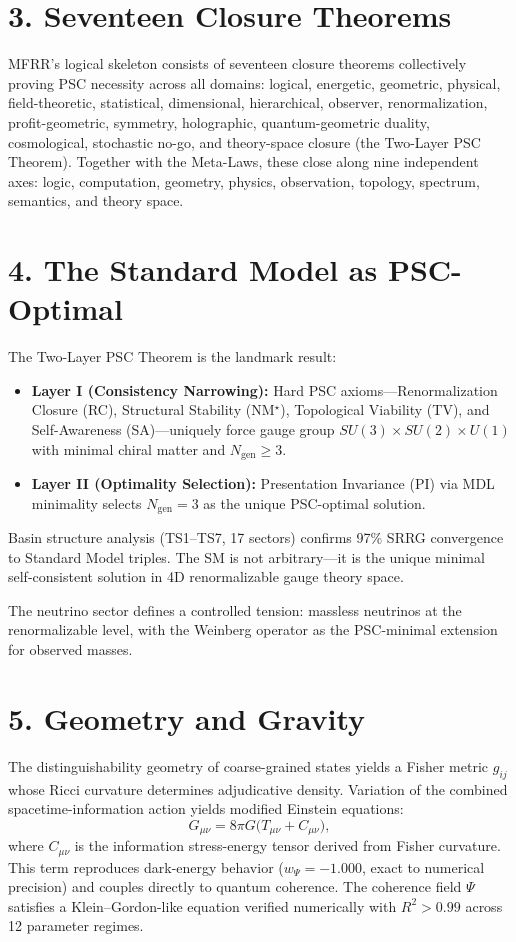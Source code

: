 \documentclass[11pt]{article}
\begin{document}
\section*{3. Seventeen Closure Theorems}

MFRR's logical skeleton consists of seventeen closure theorems collectively proving PSC necessity
across all domains: logical, energetic, geometric, physical, field-theoretic, statistical,
dimensional, hierarchical, observer, renormalization, profit-geometric, symmetry, holographic,
quantum-geometric duality, cosmological, stochastic no-go, and theory-space closure (the
Two-Layer PSC Theorem). Together with the Meta-Laws, these close along nine independent axes:
logic, computation, geometry, physics, observation, topology, spectrum, semantics, and theory space.

\section*{4. The Standard Model as PSC-Optimal}

The Two-Layer PSC Theorem is the landmark result:
\begin{itemize}
    \item \textbf{Layer I (Consistency Narrowing):} Hard PSC axioms---Renormalization Closure (RC),
    Structural Stability (NM$^\star$), Topological Viability (TV), and Self-Awareness (SA)---uniquely
    force gauge group $SU(3) \times SU(2) \times U(1)$ with minimal chiral matter and $N_{\mathrm{gen}} \ge 3$.
    \item \textbf{Layer II (Optimality Selection):} Presentation Invariance (PI) via MDL minimality
    selects $N_{\mathrm{gen}} = 3$ as the unique PSC-optimal solution.
\end{itemize}
Basin structure analysis (TS1--TS7, 17 sectors) confirms 97\% SRRG convergence to Standard Model
triples. The SM is not arbitrary---it is the unique minimal self-consistent solution in
4D renormalizable gauge theory space.

The neutrino sector defines a controlled tension: massless neutrinos at the renormalizable level,
with the Weinberg operator as the PSC-minimal extension for observed masses.

\section*{5. Geometry and Gravity}

The distinguishability geometry of coarse-grained states yields a Fisher metric $g_{ij}$ whose
Ricci curvature determines adjudicative density. Variation of the combined spacetime-information
action yields modified Einstein equations:
\[
G_{\mu\nu} = 8\pi G\bigl(T_{\mu\nu} + C_{\mu\nu}\bigr),
\]
where $C_{\mu\nu}$ is the information stress-energy tensor derived from Fisher curvature.
This term reproduces dark-energy behavior ($w_\Psi = -1.000$, exact to numerical precision)
and couples directly to quantum coherence. The coherence field $\Psi$ satisfies a
Klein--Gordon-like equation verified numerically with $R^2 > 0.99$ across 12 parameter regimes.
\end{document}
